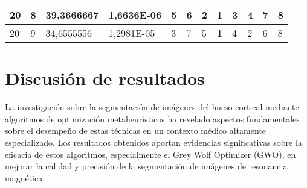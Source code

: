 \documentclass[conference]{IEEEtran}
\begin{document}
\begin{table*}[]
\begin{tabular}{|llll|llllllll|}
\multicolumn{1}{|l|}{20}                                                    & \multicolumn{1}{l|}{8}                                                        & \multicolumn{1}{l|}{39,3666667}                                                   & 1,6636E-06                     & \multicolumn{1}{l|}{5}                                                  & \multicolumn{1}{l|}{6}                                                  & \multicolumn{1}{l|}{2}                                                  & \multicolumn{1}{l|}{\textbf{1}}                                         & \multicolumn{1}{l|}{3}                                                  & \multicolumn{1}{l|}{4}                                                  & \multicolumn{1}{l|}{7}                                                  & 8                          \\ \hline
\multicolumn{1}{|l|}{20}                                                    & \multicolumn{1}{l|}{9}                                                        & \multicolumn{1}{l|}{34,6555556}                                                   & 1,2981E-05                     & \multicolumn{1}{l|}{3}                                                  & \multicolumn{1}{l|}{7}                                                  & \multicolumn{1}{l|}{5}                                                  & \multicolumn{1}{l|}{\textbf{1}}                                         & \multicolumn{1}{l|}{4}                                                  & \multicolumn{1}{l|}{2}                                                  & \multicolumn{1}{l|}{6}                                                  & 8                          \\ \hline
\end{tabular}
\end{table*}


\section{Discusión de resultados} \label{sec:di}

\noindent La investigación sobre la segmentación de imágenes del hueso cortical mediante algoritmos de optimización metaheurísticos ha revelado aspectos fundamentales sobre el desempeño de estas técnicas en un contexto médico altamente especializado. Los resultados obtenidos aportan evidencias significativas sobre la eficacia de estos algoritmos, especialmente el Grey Wolf Optimizer (GWO), en mejorar la calidad y precisión de la segmentación de imágenes de resonancia magnética.
\end{document}

